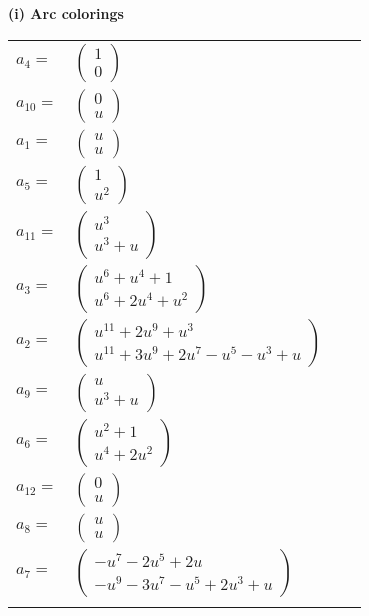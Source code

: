 \documentclass[1p]{elsarticle_modified}
\theoremstyle{definition}
\begin{document}
\flushleft \textbf{(i) Arc colorings}\\
\begin{tabular}{m{7pt} m{180pt} m{7pt} m{180pt} }
\flushright $a_{4}=$&$\begin{pmatrix}1\\0\end{pmatrix}$ \\
\flushright $a_{10}=$&$\begin{pmatrix}0\\u\end{pmatrix}$ \\
\flushright $a_{1}=$&$\begin{pmatrix}u\\u\end{pmatrix}$ \\
\flushright $a_{5}=$&$\begin{pmatrix}1\\u^2\end{pmatrix}$ \\
\flushright $a_{11}=$&$\begin{pmatrix}u^3\\u^3+u\end{pmatrix}$ \\
\flushright $a_{3}=$&$\begin{pmatrix}u^6+u^4+1\\u^6+2 u^4+u^2\end{pmatrix}$ \\
\flushright $a_{2}=$&$\begin{pmatrix}u^{11}+2 u^9+u^3\\u^{11}+3 u^9+2 u^7- u^5- u^3+u\end{pmatrix}$ \\
\flushright $a_{9}=$&$\begin{pmatrix}u\\u^3+u\end{pmatrix}$ \\
\flushright $a_{6}=$&$\begin{pmatrix}u^2+1\\u^4+2 u^2\end{pmatrix}$ \\
\flushright $a_{12}=$&$\begin{pmatrix}0\\u\end{pmatrix}$ \\
\flushright $a_{8}=$&$\begin{pmatrix}u\\u\end{pmatrix}$ \\
\flushright $a_{7}=$&$\begin{pmatrix}- u^7-2 u^5+2 u\\- u^9-3 u^7- u^5+2 u^3+u\end{pmatrix}$\\&\end{tabular}
\end{document}
